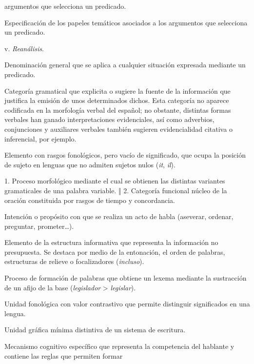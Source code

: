 \begin{glosariogeneral}
        argumentos que selecciona un predicado.
  \item[Estructura temática:] Especificación de los papeles temáticos asociados
        a los argumentos que selecciona un predicado.
  \item[Etimología popular:] v. \textit{Reanálisis}.
  \item[Evento:] Denominación general que se aplica a cualquier situación
        expresada mediante un predicado.
  \item[Evidencialidad:] Categoría gramatical que explicita o sugiere la fuente
        de la información que justifica la emisión de unos determinados dichos.
        Esta categoría no aparece codificada en la morfología verbal del
        español; no obstante, distintas formas verbales han ganado
        interpretaciones evidenciales, así como adverbios, conjunciones y
        auxiliares verbales también sugieren evidencialidad citativa o
        inferencial, por ejemplo.
  \item[Expletivo:] Elemento con rasgos fonológicos, pero vacío de
        significado, que ocupa la posición de sujeto en lenguas que no admiten
        sujetos nulos (\textit{it}, \textit{il}).
  \item[Flexión:] 1. Proceso morfológico mediante el cual se obtienen las
        distintas variantes gramaticales de una palabra variable. ‖ 2. Categoría
        funcional núcleo de la oración constituida por rasgos de tiempo y
        concordancia.
  \item[Fuerza ilocutiva:] Intención o propósito con que se realiza un acto de
        habla (aseverar, ordenar, preguntar, prometer\ldots).
  \item[Foco:] Elemento de la estructura informativa que representa la
        información no presupuesta. Se destaca por medio de la entonación, el
        orden de palabras, estructuras de relieve o focalizadores
        (\textit{incluso}).
  \item[Formación regresiva:] Proceso de formación de palabras que obtiene un
        lexema mediante la sustracción de un afijo de la base
        (\textit{legislador} > \textit{legislar}).
  \item[Fonema:] Unidad fonológica con valor contrastivo que permite distinguir
        significados en una lengua.
  \item[Grafema:] Unidad gráfica mínima distintiva de un sistema de escritura.
  \item[Gramática:] Mecanismo cognitivo específico que representa la
        competencia del hablante y contiene las reglas que permiten formar

\end{glosariogeneral}
